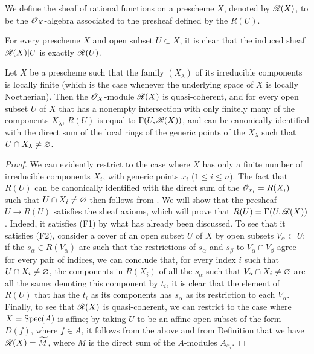 \begin{defn}[7.3.2]
\label{1.7.3.2}
We
define the sheaf of rational functions on a prescheme $X$, denoted by $\mathscr{R}(X)$, to be the $\mathscr{O}_X$-algebra associated to the presheaf defined by the $R(U)$.
\end{defn}

For every prescheme $X$ and open subset $U\subset X$, it is clear that the induced sheaf $\mathscr{R}(X)|U$ is exactly $\mathscr{R}(U)$.

\begin{prop}[7.3.3]
\label{1.7.3.3}
Let $X$ be a prescheme such that the family $(X_\lambda)$ of its irreducible components is locally finite (which is the case whenever the underlying space of $X$ is locally Noetherian).
Then the $\mathscr{O}_X$-module $\mathscr{R}(X)$ is quasi-coherent, and for every open subset $U$ of $X$ that has a nonempty intersection with only finitely many of the components $X_\lambda$, $R(U)$ is equal to $\Gamma(U,\mathscr{R}(X))$, and can be canonically identified with the direct sum of the local rings of the generic points of the $X_\lambda$ such that $U\cap X_\lambda\neq\varnothing$.
\end{prop}

\begin{proof}
\label{proof-1.7.3.3}
We can evidently restrict to the case where $X$ has only a finite number of irreducible components $X_i$, with generic points $x_i$ ($1\leq i\leq n$).
The fact that $R(U)$ can be canonically identified with the direct sum of the $\mathscr{O}_{x_i}=R(X_i)$ such that $U\cap X_i\neq\varnothing$ then follows from .
We will show that the presheaf $U\to R(U)$ satisfies the sheaf axioms, which will prove that $R(U)=\Gamma(U,\mathscr{R}(X))$.
Indeed, it satisfies (F1) by what has already been discussed.
To see that it satisfies (F2), consider a cover of an open subset $U$ of $X$ by open subsets $V_\alpha\subset U$; if the $s_\alpha\in R(V_\alpha)$ are such that the restrictions of $s_\alpha$ and $s_\beta$ to $V_\alpha\cap V_\beta$ agree for every pair of indices, we can conclude that, for every index $i$ such that $U\cap X_i\neq\varnothing$, the components in $R(X_i)$ of all the $s_\alpha$ such that $V_\alpha\cap X_i\neq\varnothing$ are all the same; denoting this component by $t_i$, it is clear that the element of $R(U)$ that has the $t_i$ as its components has $s_\alpha$ as its restriction to each $V_\alpha$.
Finally, to see that $\mathscr{R}(X)$ is quasi-coherent, we can restrict to the case where $X={\mathop{\mathrm{Spec}}\nolimits}(A)$ is affine; by taking $U$ to be an affine open subset of the form $D(f)$, where $f\in A$, it follows from the above and from Definition  that we have $\mathscr{R}(X)={\widetilde{M}}$, where $M$ is the direct sum of the $A$-modules $A_{x_i}$.
\end{proof}


